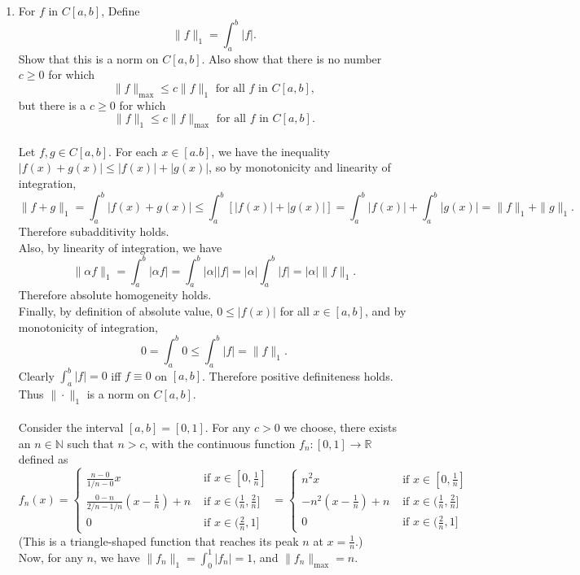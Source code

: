 \begin{enumerate}
	\setcounter{enumi}{0}
	\item For $f$ in $C[a,b]$, Define
	\[
	\| f \|_1 = \int_a^b |f|.	
	\]
	Show that this is a norm on $C[a,b]$.
	Also show that there is no number $c \ge 0$ for which
	\[
	\| f \|_{\max}	\le c \| f \|_1 \text{ for all $f$ in $C[a,b]$},
	\]
	but there is a $c \ge 0$ for which 
	\[
	\| f \|_1	\le c \| f \|_{\max} \text{ for all $f$ in $C[a,b]$}.
	\]
	\\
	Let $f,g\in C[a,b]$. For each $x\in [a.b]$, we have the inequality $|f(x)+g(x)|\le|f(x)|+|g(x)|$, so by monotonicity and linearity of integration,
	\[
	\|f+g\|_1=\int_a^b|f(x)+g(x)| \le \int_a^b[|f(x)|+|g(x)|] = \int_a^b|f(x)| +\int_a^b|g(x)| = \|f\|_1+\|g\|_1.	
	\]
	Therefore subadditivity holds.\\
	Also, by linearity of integration, we have
	\[
	\|\alpha f\|_1 = \int_a^b|\alpha f| = \int_a^b|\alpha| |f|=|\alpha|\int_a^b| f| = |\alpha|\|f\|_1.	
	\]
	Therefore absolute homogeneity holds.\\
	Finally, by definition of absolute value, $0 \le |f(x)|$ for all $x\in [a,b]$, and by monotonicity of integration,
	\[
	0=\int_a^b 0 \le \int_a^b |f| = \|f\|_1.	
	\] 
	Clearly $\int_a^b |f| = 0$ iff $f\equiv 0$ on $[a,b]$.
	Therefore positive definiteness holds.\\
	Thus $\|\cdot\|_1$ is a norm on $C[a,b]$.\\
	\\Consider the interval $[a,b]=[0,1]$.
	For any $c>0$ we choose, there exists an $n\in \mathbb{N}$ such that $n> c$, with the continuous function $f_n:[0,1]\to \mathbb{R}$ defined as
	\[ 
		f_n(x) =
		\begin{cases} 
			\frac{n-0}{1/n-0}x& \text{ if } x \in [0,\frac{1}{n}]\\
			\frac{0-n}{2/n-1/n}(x-\frac{1}{n})+n & \text{ if } x \in (\frac{1}{n},\frac{2}{n}]\\
			0& \text{ if } x \in (\frac{2}{n},1]
		\end{cases}
		=
		\begin{cases} 
			n^2x& \text{ if } x \in [0,\frac{1}{n}]\\
			-n^2(x-\frac{1}{n})+n & \text{ if } x \in (\frac{1}{n},\frac{2}{n}]\\
			0& \text{ if } x \in (\frac{2}{n},1]
		\end{cases}
	\]
	(This is a triangle-shaped function that reaches its peak $n$ at $x=\frac{1}{n}$.)\\
	Now, for any $n$, we have $\|f_n\|_1 = \int_0^1|f_n|=1$, and $\|f_n\|_{\max} = n$.\\

\end{enumerate}
